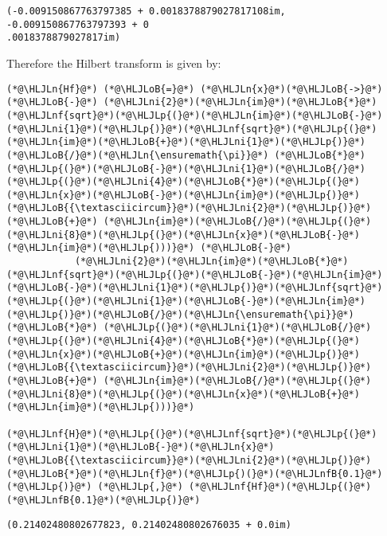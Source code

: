 \documentclass[12pt,a4paper]{article}
\newcommand{\HLJLn}[1]{#1}
\newcommand{\HLJLnf}[1]{\textcolor[RGB]{66,102,213}{#1}}
\newcommand{\HLJLnfB}[1]{\textcolor[RGB]{59,151,46}{#1}}
\newcommand{\HLJLni}[1]{\textcolor[RGB]{59,151,46}{#1}}
\newcommand{\HLJLoB}[1]{\textcolor[RGB]{102,102,102}{\textbf{#1}}}
\newcommand{\HLJLp}[1]{#1}
\begin{document}
\begin{lstlisting}
(-0.009150867763797385 + 0.0018378879027817108im, -0.009150867763797393 + 0
.0018378879027817im)
\end{lstlisting}


Therefore the Hilbert transform is given by:


\begin{lstlisting}
(*@\HLJLn{Hf}@*) (*@\HLJLoB{=}@*) (*@\HLJLn{x}@*)(*@\HLJLoB{->}@*) (*@\HLJLoB{-}@*) (*@\HLJLni{2}@*)(*@\HLJLn{im}@*)(*@\HLJLoB{*}@*)(*@\HLJLnf{sqrt}@*)(*@\HLJLp{(}@*)(*@\HLJLn{im}@*)(*@\HLJLoB{-}@*)(*@\HLJLni{1}@*)(*@\HLJLp{)}@*)(*@\HLJLnf{sqrt}@*)(*@\HLJLp{(}@*)(*@\HLJLn{im}@*)(*@\HLJLoB{+}@*)(*@\HLJLni{1}@*)(*@\HLJLp{)}@*)(*@\HLJLoB{/}@*)(*@\HLJLn{\ensuremath{\pi}}@*) (*@\HLJLoB{*}@*) (*@\HLJLp{(}@*)(*@\HLJLoB{-}@*)(*@\HLJLni{1}@*)(*@\HLJLoB{/}@*)(*@\HLJLp{(}@*)(*@\HLJLni{4}@*)(*@\HLJLoB{*}@*)(*@\HLJLp{(}@*)(*@\HLJLn{x}@*)(*@\HLJLoB{-}@*)(*@\HLJLn{im}@*)(*@\HLJLp{)}@*)(*@\HLJLoB{{\textasciicircum}}@*)(*@\HLJLni{2}@*)(*@\HLJLp{)}@*) (*@\HLJLoB{+}@*) (*@\HLJLn{im}@*)(*@\HLJLoB{/}@*)(*@\HLJLp{(}@*)(*@\HLJLni{8}@*)(*@\HLJLp{(}@*)(*@\HLJLn{x}@*)(*@\HLJLoB{-}@*)(*@\HLJLn{im}@*)(*@\HLJLp{)))}@*) (*@\HLJLoB{-}@*)
            (*@\HLJLni{2}@*)(*@\HLJLn{im}@*)(*@\HLJLoB{*}@*)(*@\HLJLnf{sqrt}@*)(*@\HLJLp{(}@*)(*@\HLJLoB{-}@*)(*@\HLJLn{im}@*)(*@\HLJLoB{-}@*)(*@\HLJLni{1}@*)(*@\HLJLp{)}@*)(*@\HLJLnf{sqrt}@*)(*@\HLJLp{(}@*)(*@\HLJLni{1}@*)(*@\HLJLoB{-}@*)(*@\HLJLn{im}@*)(*@\HLJLp{)}@*)(*@\HLJLoB{/}@*)(*@\HLJLn{\ensuremath{\pi}}@*) (*@\HLJLoB{*}@*) (*@\HLJLp{(}@*)(*@\HLJLni{1}@*)(*@\HLJLoB{/}@*)(*@\HLJLp{(}@*)(*@\HLJLni{4}@*)(*@\HLJLoB{*}@*)(*@\HLJLp{(}@*)(*@\HLJLn{x}@*)(*@\HLJLoB{+}@*)(*@\HLJLn{im}@*)(*@\HLJLp{)}@*)(*@\HLJLoB{{\textasciicircum}}@*)(*@\HLJLni{2}@*)(*@\HLJLp{)}@*) (*@\HLJLoB{+}@*) (*@\HLJLn{im}@*)(*@\HLJLoB{/}@*)(*@\HLJLp{(}@*)(*@\HLJLni{8}@*)(*@\HLJLp{(}@*)(*@\HLJLn{x}@*)(*@\HLJLoB{+}@*)(*@\HLJLn{im}@*)(*@\HLJLp{)))}@*)

(*@\HLJLnf{H}@*)(*@\HLJLp{(}@*)(*@\HLJLnf{sqrt}@*)(*@\HLJLp{(}@*)(*@\HLJLni{1}@*)(*@\HLJLoB{-}@*)(*@\HLJLn{x}@*)(*@\HLJLoB{{\textasciicircum}}@*)(*@\HLJLni{2}@*)(*@\HLJLp{)}@*)(*@\HLJLoB{*}@*)(*@\HLJLn{f}@*)(*@\HLJLp{)(}@*)(*@\HLJLnfB{0.1}@*)(*@\HLJLp{)}@*) (*@\HLJLp{,}@*) (*@\HLJLnf{Hf}@*)(*@\HLJLp{(}@*)(*@\HLJLnfB{0.1}@*)(*@\HLJLp{)}@*)
\end{lstlisting}

\begin{lstlisting}
(0.21402480802677823, 0.21402480802676035 + 0.0im)
\end{lstlisting}
\end{document}
